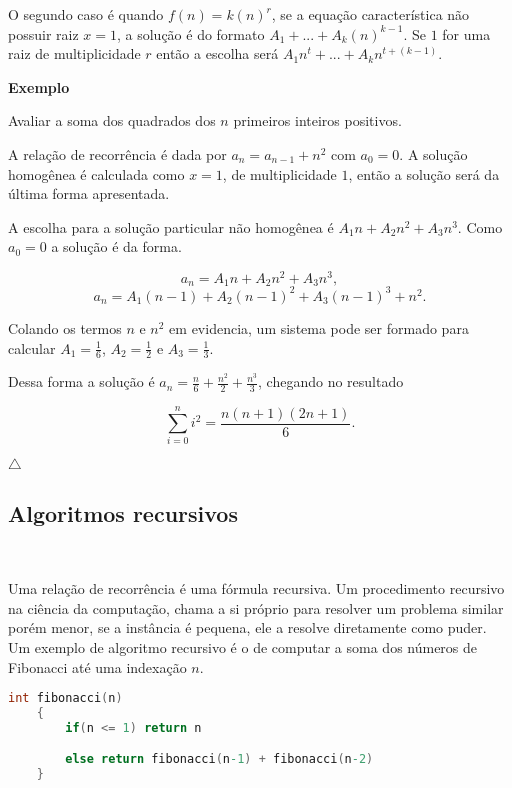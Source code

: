 O segundo caso é quando $f(n) = k(n)^r$, se a equação característica não possuir raiz $x = 1$, a solução é do formato $A_1 + ... + A_k(n)^{k-1}$. Se $1$ for uma raiz de multiplicidade $r$ então a escolha será $A_1n^t + ... + A_kn^{t+(k-1)}$.

\textbf{Exemplo}

Avaliar a soma dos quadrados dos $n$ primeiros inteiros positivos.

A relação de recorrência é dada por $a_n = a_{n-1} + n^2$ com $a_0 = 0$. A solução homogênea é calculada como $x = 1$, de multiplicidade $1$, então a solução será da última forma apresentada.

A escolha para a solução particular não homogênea é $A_1n + A_2n^2 + A_3n^3$. Como $a_0 = 0$ a solução é da forma.

\[a_n = A_1n + A_2n^2 + A_3n^3,\]
\[a_n  = A_1(n-1) + A_2(n-1)^2 + A_3(n-1)^3 + n^2.\]

Colando os termos $n$ e $n^2$ em evidencia, um sistema pode ser formado para calcular $A_1 = \frac{1}{6}$, $A_2 = \frac{1}{2}$ e $A_3 = \frac{1}{3}$.

Dessa forma a solução é $a_n = \frac{n}{6} + \frac{n^2}{2} + \frac{n^3}{3}$, chegando no resultado

\[\sum_{i=0}^{n} i^2 = \frac{n(n+1)(2n+1)}{6}.\]

{\raggedleft $\bigtriangleup$ \par}

\subsection{Algoritmos recursivos}
\

Uma relação de recorrência é uma fórmula recursiva. Um procedimento recursivo na ciência da computação, chama a si próprio para resolver um problema similar porém menor, se a instância é pequena, ele a resolve diretamente como puder. Um exemplo de algoritmo recursivo é o de computar a soma dos números de Fibonacci até uma indexação $n$.

\begin{lstlisting}[language=C, frame=single]
    int fibonacci(n)
    {
        if(n <= 1) return n

        else return fibonacci(n-1) + fibonacci(n-2)
    }
\end{lstlisting}